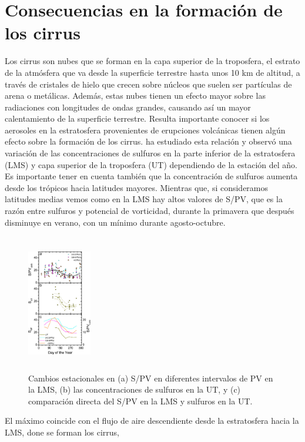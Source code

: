 \documentclass[a4apaper,twocolumn,10pt]{article}
\begin{document}
\section{Consecuencias en la formaci\'on de los cirrus}
Los cirrus son nubes que se forman en la capa superior de la troposfera, el estrato de la atm\'osfera que va desde la superficie terrestre hasta unos 10 km de altitud, a trav\'es de cristales de hielo que crecen sobre n\'ucleos que suelen ser part\'iculas de arena o met\'alicas. Adem\'as, estas nubes tienen un efecto mayor sobre las radiaciones con longitudes de ondas grandes, causando as\'i un mayor calentamiento de la superficie terrestre. Resulta importante conocer si los aerosoles en la estratosfera provenientes de erupciones volc\'anicas tienen alg\'un efecto sobre la formaci\'on de los cirrus. \cite{friberg2015influence} ha estudiado esta relaci\'on y observ\'o una variaci\'on de las concentraciones de sulfuros en la parte inferior de la estratosfera (LMS) y capa superior de la troposfera (UT) dependiendo de la estaci\'on del a\~no. Es importante tener en cuenta tambi\'en que la concentraci\'on de sulfuros aumenta desde los tr\'opicos hacia latitudes mayores. Mientras que, si consideramos latitudes medias vemos como en la LMS hay altos valores de S/PV, que es la raz\'on entre sulfuros y potencial de vorticidad, durante la primavera que despu\'es disminuye en verano, con un m\'inimo durante agosto-octubre. 
\begin{figure}[t]
\centering
  \includegraphics[width=0.25\textwidth,height=6cm]{Figura1}
  \caption{Cambios estacionales en (a) S/PV en diferentes intervalos de PV en la LMS, (b) las concentraciones de sulfuros en la UT, y (c) comparación directa del S/PV en la LMS y sulfuros en la UT.}
  \label{fig:Figura1}
\end{figure}
El m\'aximo coincide con el flujo de aire descendiente desde la estratosfera hacia la LMS, done se forman los cirrus,
\end{document}

